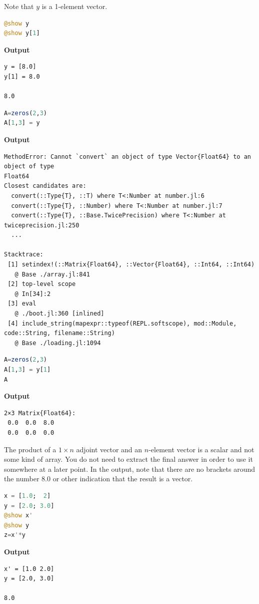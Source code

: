 Note that $y$ is a 1-element vector. \\

\begin{lstlisting}[language=Julia,style=mystyle]
@show y
@show y[1]
\end{lstlisting}
\textbf{Output} 
\begin{verbatim}
y = [8.0]
y[1] = 8.0

8.0
\end{verbatim}


\begin{lstlisting}[language=Julia,style=mystyle]
A=zeros(2,3)
A[1,3] = y
\end{lstlisting}
\textbf{Output} 
\begin{verbatim}
MethodError: Cannot `convert` an object of type Vector{Float64} to an object of type
Float64
Closest candidates are:
  convert(::Type{T}, ::T) where T<:Number at number.jl:6
  convert(::Type{T}, ::Number) where T<:Number at number.jl:7
  convert(::Type{T}, ::Base.TwicePrecision) where T<:Number at twiceprecision.jl:250
  ...

Stacktrace:
 [1] setindex!(::Matrix{Float64}, ::Vector{Float64}, ::Int64, ::Int64)
   @ Base ./array.jl:841
 [2] top-level scope
   @ In[34]:2
 [3] eval
   @ ./boot.jl:360 [inlined]
 [4] include_string(mapexpr::typeof(REPL.softscope), mod::Module, code::String, filename::String)
   @ Base ./loading.jl:1094
\end{verbatim}

\begin{lstlisting}[language=Julia,style=mystyle]
A=zeros(2,3)
A[1,3] = y[1]
A
\end{lstlisting}
\textbf{Output} 
\begin{verbatim}
2×3 Matrix{Float64}:
 0.0  0.0  8.0
 0.0  0.0  0.0
\end{verbatim}

The product of a $1 \times n$ adjoint vector and an $n$-element vector is a scalar and not some kind of array. You do not need to extract the final answer in order to use it somewhere at a later point. In the output, note that there are no brackets around the number $8.0$ or other indication that the result is a vector.\\
 
\begin{lstlisting}[language=Julia,style=mystyle]
x = [1.0;  2]
y = [2.0; 3.0]
@show x'
@show y
z=x'*y
\end{lstlisting}
\textbf{Output} 
\begin{verbatim}
x' = [1.0 2.0]
y = [2.0, 3.0]

8.0
\end{verbatim}

